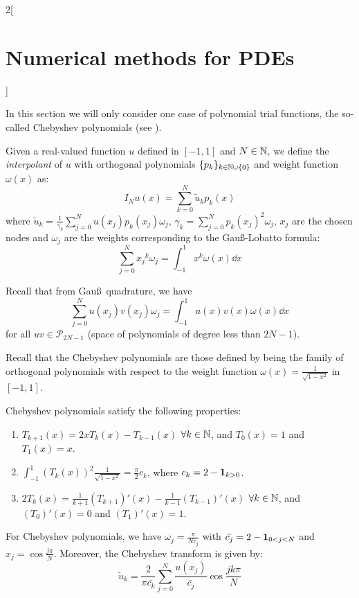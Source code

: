\documentclass[../../../main_math.tex]{subfiles}
\begin{document}
\begin{multicols}{2}[\section{Numerical methods for PDEs}]
\begin{remark}
    In this section we will only consider one case of polynomial trial functions, the so-called Chebyshev polynomials (see ).
  \end{remark}
  \begin{definition}
    Given a real-valued function $u$ defined in $[-1,1]$ and $N\in\mathbb{N}$, we define the \emph{interpolant} of $u$ with orthogonal polynomials $\{p_k\}_{k\in\mathbb{N}\cup\{0\}}$ and weight function $\omega(x)$ as:
    $$
      I_Nu(x)=\sum_{k=0}^N \tilde{u}_k p_k(x)
    $$
    where $\displaystyle \tilde{u}_k=\frac{1}{\gamma_k}\sum_{j=0}^N u(x_j)p_k(x_j)\omega_j$, $\displaystyle\gamma_k=\sum_{j=0}^N p_k(x_j)^2\omega_j$, $x_j$ are the chosen nodes and $\omega_j$ are the weights corresponding to the Gau\ss-Lobatto formula:
    $$
      \sum_{j=0}^N{x_j}^k\omega_j=\int_{-1}^1{x}^k\omega(x)\dd{x}
    $$
  \end{definition}
  \begin{remark}
    Recall that from Gau\ss\ quadrature, we have
    $$
      \sum_{j=0}^N u(x_j) v(x_j) \omega_j = \int_{-1}^1 u(x) v(x) \omega(x) \dd{x}
    $$
    for all $uv\in \mathcal{P}_{2N-1}$ (space of polynomials of degree less than $2N-1$).
  \end{remark}
  \begin{remark}
    Recall that the Chebyshev polynomials are those defined by being the family of orthogonal polynomials with respect to the weight function $\omega(x)=\frac{1}{\sqrt{1-x^2}}$ in $[-1,1]$.
  \end{remark}
  \begin{lemma}
    Chebyshev polynomials satisfy the following properties:
    \begin{enumerate}
      \item $T_{k+1}(x)=2xT_k(x)-T_{k-1}(x)$ $\forall k\in\mathbb{N}$, and $T_0(x)=1$ and $T_1(x)=x$.
      \item $\displaystyle\int_{-1}^1{(T_k(x))}^2\frac{1}{\sqrt{1-x^2}}=\frac{\pi}{2}c_k$, where $c_k=2 - \boldsymbol{\mathrm{1}}_{k>0}$.
      \item $2T_k(x)=\frac{1}{k+1}{(T_{k+1})}'(x)-\frac{1}{k-1}{(T_{k-1})}'(x)$ $\forall k\in\mathbb{N}$, and ${(T_0)}'(x)=0$ and ${(T_1)}'(x)=1$.
    \end{enumerate}
  \end{lemma}
  \begin{proposition}
    For Chebyshev polynomials, we have $\omega_j=\frac{\pi}{N\bar{c_j}}$ with $\bar{c_j}=2-\boldsymbol{\mathrm{1}}_{0<j<N}$ and $x_j=\cos{\frac{j\pi}{N}}$. Moreover, the Chebyshev transform is given by:
    $$
      \tilde{u}_k=\frac{2}{\pi\bar{c_k}}\sum_{j=0}^N \frac{u(x_j)}{\bar{c_j}}\cos{\frac{jk\pi}{N}}
$$
\end{proposition}
\end{multicols}
\end{document}
